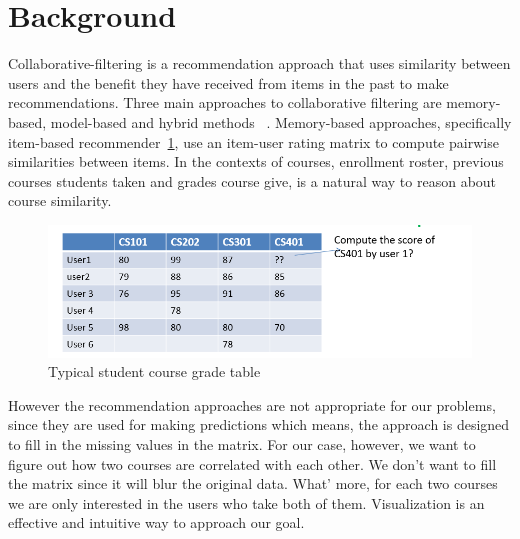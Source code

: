 \section{Background}
\label{sec:background}

Collaborative-filtering is a recommendation approach that uses similarity between users and the benefit they have received from items in the past to make recommendations. Three main approaches to collaborative filtering are memory-based, model-based and hybrid methods~\cite{Su:2009:SCF:1592474.1722966} . Memory-based approaches, specifically item-based recommender~\ref{fig:predict}, use an item-user rating matrix to compute pairwise similarities between items. In the contexts of courses, enrollment roster, previous courses students taken and grades course give, is a natural way to reason about course similarity.  

\begin{figure}[h]
 \centering %
 \includegraphics[width=\linewidth]{figs/predict}
 \caption{Typical student course grade table}
 \label{fig:predict}
\end{figure}

However the recommendation approaches are not appropriate for our problems, since they are used for making predictions which means, the approach is designed to fill in the missing values in the matrix. For our case, however, we want to figure out how two courses are correlated with each other. We don’t want to fill the matrix since it will blur the original data. What’ more, for each two courses we are only interested in the users who take both of them. Visualization is an effective and intuitive way to approach our goal.  

